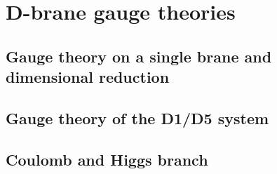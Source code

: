

\chapter{D-brane gauge theories}
\label{chap:gauge}
\pagestyle{fancy}

\section{Gauge theory on a single brane and dimensional reduction}

\section{Gauge theory of the D1/D5 system}

\section{Coulomb and Higgs branch}